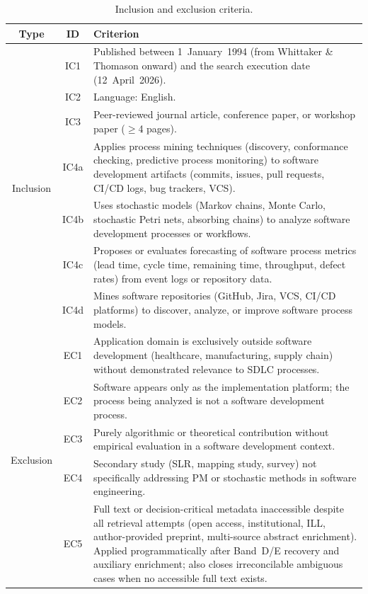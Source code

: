 \begin{table}[htbp]
\centering
\caption{Inclusion and exclusion criteria.}
\label{tab:criteria}
\small
\setlength{\tabcolsep}{4pt}
\begin{tabular}{c c p{10.2cm}}
\toprule
\textbf{Type} & \textbf{ID} & \textbf{Criterion} \\
\midrule
\multirow{7}{*}{Inclusion}
& IC1  & Published between 1~January~1994 (from Whittaker \& Thomason
          onward) and the search execution date (12~April~2026). \\
& IC2  & Language: English. \\
& IC3  & Peer-reviewed journal article, conference paper, or workshop paper
          ($\geq$4 pages). \\
& IC4a & Applies process mining techniques (discovery, conformance checking,
          predictive process monitoring) to software development artifacts
          (commits, issues, pull requests, CI/CD logs, bug trackers, VCS). \\
& IC4b & Uses stochastic models (Markov chains, Monte Carlo, stochastic Petri
          nets, absorbing chains) to analyze software development processes or
          workflows. \\
& IC4c & Proposes or evaluates forecasting of software process metrics (lead
          time, cycle time, remaining time, throughput, defect rates) from
          event logs or repository data. \\
& IC4d & Mines software repositories (GitHub, Jira, VCS, CI/CD platforms) to
          discover, analyze, or improve software process models. \\
\midrule
\multirow{5}{*}{Exclusion}
& EC1  & Application domain is exclusively outside software development
          (healthcare, manufacturing, supply chain) without demonstrated
          relevance to SDLC processes. \\
& EC2  & Software appears only as the implementation platform; the process
          being analyzed is not a software development process. \\
& EC3  & Purely algorithmic or theoretical contribution without empirical
          evaluation in a software development context. \\
& EC4  & Secondary study (SLR, mapping study, survey) not specifically
          addressing PM or stochastic methods in software engineering. \\
& EC5  & Full text or decision-critical metadata inaccessible despite all
          retrieval attempts (open access, institutional, ILL,
          author-provided preprint, multi-source abstract enrichment).
          Applied programmatically after Band~D/E recovery and auxiliary
          enrichment; also closes irreconcilable ambiguous cases when no
          accessible full text exists. \\
\bottomrule
\end{tabular}
\end{table}

